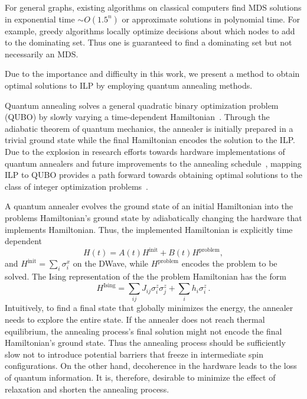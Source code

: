 \documentclass[prd,twocolumn,tightenlines,preprintnumbers,showpacs,superscriptaddress,notitlepage,nofootinbib,eqsecnum,floatfix,longbibliography,aps,10pt]{revtex4-2}
\begin{document}
For general graphs, existing algorithms on classical computers find MDS solutions in exponential time $\sim O( 1.5^n)$ \cite{Fomin2009, vanRooij2009} or approximate solutions in polynomial time. For example, greedy algorithms locally optimize decisions about which nodes to add to the dominating set.
Thus one is guaranteed to find a dominating set but not necessarily an MDS.

Due to the importance and difficulty in this work, we present a method to obtain optimal solutions to ILP by employing quantum annealing methods.

Quantum annealing solves a general quadratic binary optimization problem (QUBO) by slowly varying a time-dependent Hamiltonian~\cite{}.
Through the adiabatic theorem of quantum mechanics, the annealer is initially prepared in a trivial ground state while the final Hamiltonian encodes the solution to the ILP.
Due to the explosion in research efforts towards hardware implementations of quantum annealers and future improvements to the annealing schedule~\cite{}, mapping ILP to QUBO provides a path forward towards obtaining optimal solutions to the class of integer optimization problems~\cite{2018Glover}.

A quantum annealer evolves the ground state of an initial Hamiltonian into the problems Hamiltonian's ground state by adiabatically changing the hardware that implements Hamiltonian.
Thus, the implemented Hamiltonian is explicitly time dependent
\begin{equation}
 H(t) = A(t) H^{\textrm{init}} + B(t) H^{\textrm{problem}}, \label{eq:tdhamiltonian}
\end{equation}
and $H^\textrm{init}=\sum_i\sigma^x_i$ on the DWave, while $H^\textrm{problem}$ encodes the problem to be solved.
The Ising representation of the the problem Hamiltonian has the form
\begin{equation}
 H^{\textrm{Ising}} = \sum_{ij} J_{ij} \sigma^z_i \sigma^z_j + \sum_i h_i \sigma^z_i \, .
\end{equation}
Intuitively, to find a final state that globally minimizes the energy, the annealer needs to explore the entire state.
If the annealer does not reach thermal equilibrium, the annealing process's final solution might not encode the final Hamiltonian's ground state.
Thus the annealing process should be sufficiently slow not to introduce potential barriers that freeze in intermediate spin configurations.
On the other hand, decoherence in the hardware leads to the loss of quantum information.
It is, therefore, desirable to minimize the effect of relaxation and shorten the annealing process.
\end{document}
